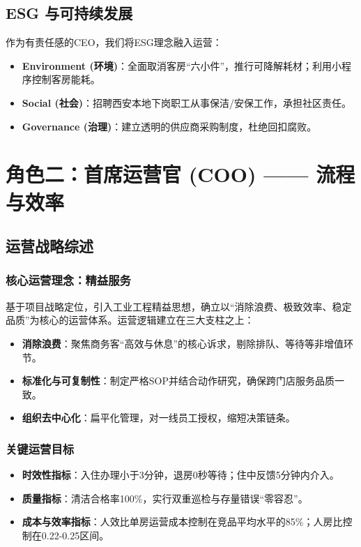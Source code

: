 \documentclass{cumcmthesis}
\begin{document}
\subsection{ESG 与可持续发展}
作为有责任感的CEO，我们将ESG理念融入运营：
\begin{itemize}
    \item \textbf{Environment (环境)}：全面取消客房“六小件”，推行可降解耗材；利用小程序控制客房能耗。
    \item \textbf{Social (社会)}：招聘西安本地下岗职工从事保洁/安保工作，承担社区责任。
    \item \textbf{Governance (治理)}：建立透明的供应商采购制度，杜绝回扣腐败。
\end{itemize}


\section{角色二：首席运营官 (COO) —— 流程与效率}

\subsection{运营战略综述}
\subsubsection{核心运营理念：精益服务}
基于项目战略定位，引入工业工程精益思想，确立以“消除浪费、极致效率、稳定品质”为核心的运营体系。运营逻辑建立在三大支柱之上：
\begin{itemize}
    \item \textbf{消除浪费}：聚焦商务客“高效与休息”的核心诉求，剔除排队、等待等非增值环节。
    \item \textbf{标准化与可复制性}：制定严格SOP并结合动作研究，确保跨门店服务品质一致。
    \item \textbf{组织去中心化}：扁平化管理，对一线员工授权，缩短决策链条。
\end{itemize}

\subsubsection{关键运营目标}
\begin{itemize}
    \item \textbf{时效性指标}：入住办理小于3分钟，退房0秒等待；住中反馈5分钟内介入。
    \item \textbf{质量指标}：清洁合格率100\%，实行双重巡检与存量错误“零容忍”。
    \item \textbf{成本与效率指标}：人效比单房运营成本控制在竞品平均水平的85\%；人房比控制在0.22-0.25区间。
\end{itemize}
\end{document}
